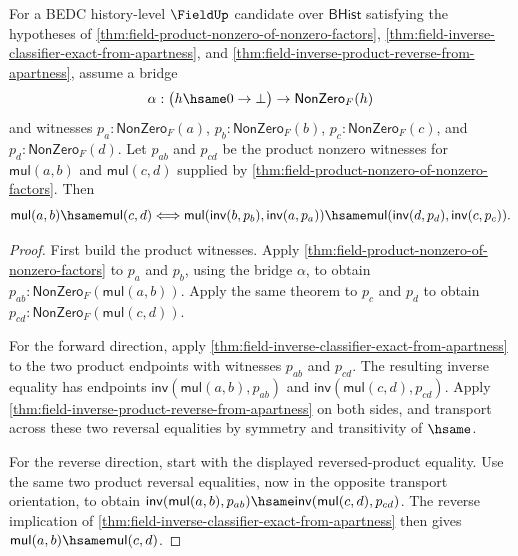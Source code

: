 \begin{theorem}
\label{thm:field-inverse-product-classifier-exact-from-apartness}
For a BEDC history-level $\FieldUp$ candidate over $\mathsf{BHist}$ satisfying
the hypotheses of
\autoref{thm:field-product-nonzero-of-nonzero-factors},
\autoref{thm:field-inverse-classifier-exact-from-apartness}, and
\autoref{thm:field-inverse-product-reverse-from-apartness}, assume a bridge
$$
\alpha:\bigl(h\hsame0\to\bot\bigr)\to\mathsf{NonZero}_F(h)
$$
and witnesses $p_a:\mathsf{NonZero}_F(a)$,
$p_b:\mathsf{NonZero}_F(b)$, $p_c:\mathsf{NonZero}_F(c)$, and
$p_d:\mathsf{NonZero}_F(d)$. Let $p_{ab}$ and $p_{cd}$ be the product nonzero
witnesses for $\mathsf{mul}(a,b)$ and $\mathsf{mul}(c,d)$ supplied by
\autoref{thm:field-product-nonzero-of-nonzero-factors}. Then
$$
\mathsf{mul}(a,b)\hsame\mathsf{mul}(c,d) \Longleftrightarrow
\mathsf{mul}(\mathsf{inv}(b,p_b),\mathsf{inv}(a,p_a))\hsame
\mathsf{mul}(\mathsf{inv}(d,p_d),\mathsf{inv}(c,p_c)).
$$
\end{theorem}
\begin{proof}
First build the product witnesses. Apply
\autoref{thm:field-product-nonzero-of-nonzero-factors} to $p_a$ and $p_b$,
using the bridge $\alpha$, to obtain
$p_{ab}:\mathsf{NonZero}_F(\mathsf{mul}(a,b))$. Apply the same theorem to
$p_c$ and $p_d$ to obtain
$p_{cd}:\mathsf{NonZero}_F(\mathsf{mul}(c,d))$.

For the forward direction, apply
\autoref{thm:field-inverse-classifier-exact-from-apartness} to the two product
endpoints with witnesses $p_{ab}$ and $p_{cd}$. The resulting inverse equality
has endpoints $\mathsf{inv}(\mathsf{mul}(a,b),p_{ab})$ and
$\mathsf{inv}(\mathsf{mul}(c,d),p_{cd})$. Apply
\autoref{thm:field-inverse-product-reverse-from-apartness} on both sides, and
transport across these two reversal equalities by symmetry and transitivity of
$\hsame$.

For the reverse direction, start with the displayed reversed-product equality.
Use the same two product reversal equalities, now in the opposite transport
orientation, to obtain
$\mathsf{inv}(\mathsf{mul}(a,b),p_{ab})\hsame
\mathsf{inv}(\mathsf{mul}(c,d),p_{cd})$. The reverse implication of
\autoref{thm:field-inverse-classifier-exact-from-apartness} then gives
$\mathsf{mul}(a,b)\hsame\mathsf{mul}(c,d)$.
\end{proof}

